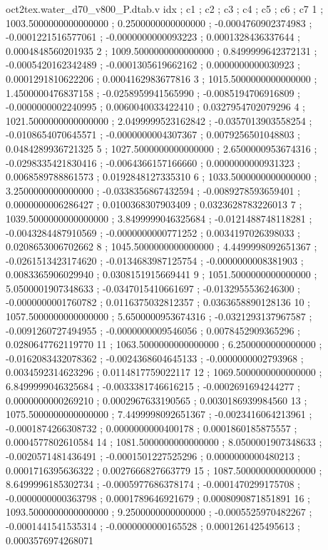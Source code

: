 \begin{filecontents}[overwrite]{oct2tex.water_d70_v800_P.dtab.v}
idx ; c1 ; c2 ; c3 ; c4 ; c5 ; c6 ; c7
1 ; 1003.5000000000000000 ; 0.2500000000000000 ; -0.0004760902374983 ; -0.0001221516577061 ; -0.0000000000093223 ; 0.0001328436337644 ; 0.0004848560201935
2 ; 1009.5000000000000000 ; 0.8499999642372131 ; -0.0005420162342489 ; -0.0001305619662162 ; 0.0000000000030923 ; 0.0001291810622206 ; 0.0004162983677816
3 ; 1015.5000000000000000 ; 1.4500000476837158 ; -0.0258959941565990 ; -0.0085194706916809 ; -0.0000000002240995 ; 0.0060040033422410 ; 0.0327954702079296
4 ; 1021.5000000000000000 ; 2.0499999523162842 ; -0.0357013903558254 ; -0.0108654070645571 ; -0.0000000004307367 ; 0.0079256501048803 ; 0.0484289936721325
5 ; 1027.5000000000000000 ; 2.6500000953674316 ; -0.0298335421830416 ; -0.0064366157166660 ; 0.0000000000931323 ; 0.0068589788861573 ; 0.0192848127335310
6 ; 1033.5000000000000000 ; 3.2500000000000000 ; -0.0338356867432594 ; -0.0089278593659401 ; 0.0000000006286427 ; 0.0100368307903409 ; 0.0323628783226013
7 ; 1039.5000000000000000 ; 3.8499999046325684 ; -0.0121488748118281 ; -0.0043284487910569 ; -0.0000000000771252 ; 0.0034197026398033 ; 0.0208653006702662
8 ; 1045.5000000000000000 ; 4.4499998092651367 ; -0.0261513423174620 ; -0.0134683987125754 ; -0.0000000008381903 ; 0.0083365906029940 ; 0.0308151915669441
9 ; 1051.5000000000000000 ; 5.0500001907348633 ; -0.0347015410661697 ; -0.0132955536246300 ; -0.0000000001760782 ; 0.0116375032812357 ; 0.0363658890128136
10 ; 1057.5000000000000000 ; 5.6500000953674316 ; -0.0321293137967587 ; -0.0091260727494955 ; -0.0000000009546056 ; 0.0078452909365296 ; 0.0280647762119770
11 ; 1063.5000000000000000 ; 6.2500000000000000 ; -0.0162083432078362 ; -0.0024368604645133 ; -0.0000000002793968 ; 0.0034592314623296 ; 0.0114817759022117
12 ; 1069.5000000000000000 ; 6.8499999046325684 ; -0.0033381746616215 ; -0.0002691694244277 ; 0.0000000000269210 ; 0.0002967633190565 ; 0.0030186939984560
13 ; 1075.5000000000000000 ; 7.4499998092651367 ; -0.0023416064213961 ; -0.0001874266308732 ; 0.0000000000400178 ; 0.0001860185875557 ; 0.0004577802610584
14 ; 1081.5000000000000000 ; 8.0500001907348633 ; -0.0020571481436491 ; -0.0001501227525296 ; 0.0000000000480213 ; 0.0001716395636322 ; 0.0027666827663779
15 ; 1087.5000000000000000 ; 8.6499996185302734 ; -0.0005977686378174 ; -0.0001470299175708 ; -0.0000000000363798 ; 0.0001789646921679 ; 0.0008090871851891
16 ; 1093.5000000000000000 ; 9.2500000000000000 ; -0.0005525970482267 ; -0.0001441541535314 ; -0.0000000000165528 ; 0.0001261425495613 ; 0.0003576974268071

\end{filecontents}
